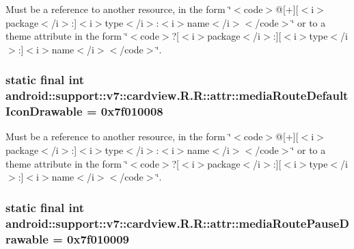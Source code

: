 Must be a reference to another resource, in the form \char`\"{}$<$code$>$@\mbox{[}+\mbox{]}\mbox{[}$<$i$>$package$<$/i$>$:\mbox{]}$<$i$>$type$<$/i$>$:$<$i$>$name$<$/i$>$$<$/code$>$\char`\"{} or to a theme attribute in the form \char`\"{}$<$code$>$?\mbox{[}$<$i$>$package$<$/i$>$:\mbox{]}\mbox{[}$<$i$>$type$<$/i$>$:\mbox{]}$<$i$>$name$<$/i$>$$<$/code$>$\char`\"{}. \hypertarget{classandroid_1_1support_1_1v7_1_1cardview_1_1_r_1_1attr_78cb2a6872073dd3b5ad969728f54474}{
\subsubsection[{mediaRouteDefaultIconDrawable}]{\setlength{\rightskip}{0pt plus 5cm}static final int android::support::v7::cardview.R.R::attr::mediaRouteDefaultIconDrawable = 0x7f010008}}
\label{classandroid_1_1support_1_1v7_1_1cardview_1_1_r_1_1attr_78cb2a6872073dd3b5ad969728f54474}


Must be a reference to another resource, in the form \char`\"{}$<$code$>$@\mbox{[}+\mbox{]}\mbox{[}$<$i$>$package$<$/i$>$:\mbox{]}$<$i$>$type$<$/i$>$:$<$i$>$name$<$/i$>$$<$/code$>$\char`\"{} or to a theme attribute in the form \char`\"{}$<$code$>$?\mbox{[}$<$i$>$package$<$/i$>$:\mbox{]}\mbox{[}$<$i$>$type$<$/i$>$:\mbox{]}$<$i$>$name$<$/i$>$$<$/code$>$\char`\"{}. \hypertarget{classandroid_1_1support_1_1v7_1_1cardview_1_1_r_1_1attr_56899ff424afe4d4febdb9c8dc109933}{
\subsubsection[{mediaRoutePauseDrawable}]{\setlength{\rightskip}{0pt plus 5cm}static final int android::support::v7::cardview.R.R::attr::mediaRoutePauseDrawable = 0x7f010009}}
\label{classandroid_1_1support_1_1v7_1_1cardview_1_1_r_1_1attr_56899ff424afe4d4febdb9c8dc109933}


